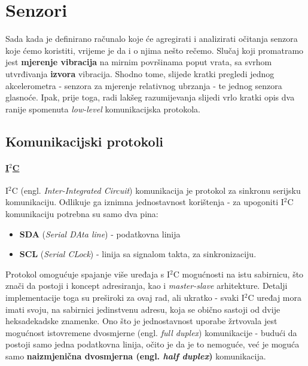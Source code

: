 \documentclass[12pt,a4paper]{article}
\begin{document}

\newpage


\section{Senzori}
	Sada kada je definirano računalo koje će agregirati i analizirati očitanja senzora koje ćemo koristiti, vrijeme je da i o njima nešto rečemo. Slučaj koji promatramo jest \textbf{mjerenje vibracija} na mirnim površinama poput vrata, sa svrhom utvrđivanja \textbf{izvora} vibracija. Shodno tome, slijede kratki pregledi jednog akcelerometra - senzora za mjerenje relativnog ubrzanja - te jednog senzora glasnoće.
	Ipak, prije toga, radi lakšeg razumijevanja slijedi vrlo kratki opis dva ranije spomenuta \textit{low-level} komunikacijska protokola.

	\subsection{Komunikacijski protokoli}
	\paragraph{\underline{I$^2$C}} %
	\label{par:i2c}
		I$^2$C (engl. \textit{Inter-Integrated Circuit}) komunikacija je protokol za sinkronu serijsku komunikaciju. Odlikuje ga iznimna jednostavnost korištenja - za upogoniti I$^2$C komunikaciju potrebna su samo dva pina:
		\begin{itemize} 
			\item \textbf{SDA} (\textit{Serial DAta line}) - podatkovna linija
			\item \textbf{SCL} (\textit{Serial CLock}) - linija sa signalom takta, za sinkronizaciju.
		\end{itemize}
		Protokol omogućuje spajanje više uređaja s I$^2$C mogućnosti na istu sabirnicu, što znači da postoji i koncept adresiranja, kao i \textit{master-slave} arhitekture. Detalji implementacije toga su preširoki za ovaj rad, ali ukratko - svaki I$^2$C uređaj mora imati svoju, na sabirnici jedinstvenu adresu, koja se obično sastoji od dvije heksadekadske znamenke. 
		Ono što je jednostavnost uporabe žrtvovala jest mogućnost istovremene dvosmjerne (engl. \textit{full duplex}) komunikacije - budući da postoji samo jedna podatkovna linija, očito je da je to nemoguće, već je moguća samo \textbf{naizmjenična dvosmjerna (engl. \textit{half duplex})} komunikacija.
\end{document}
